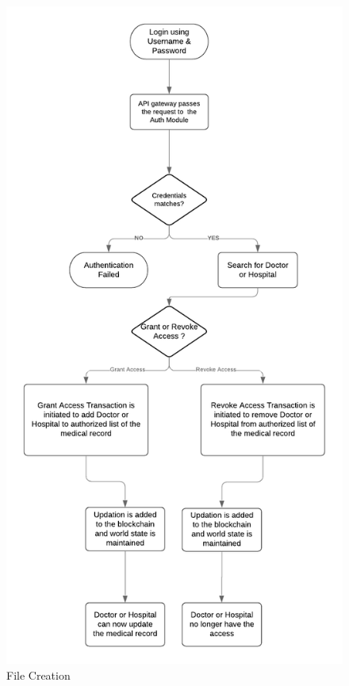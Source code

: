 \documentclass[11pt]{report}
\begin{document}
    \begin{figure}[h!]
        \centering
        \includegraphics[scale=0.8]{F2.png}
        \caption{File Creation}
        \label{fig:my_label}
    \end{figure}
    
\end{document}
